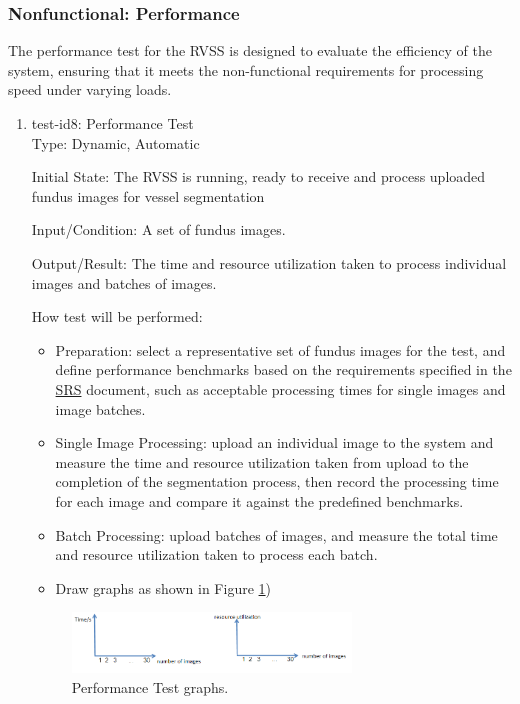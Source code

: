 \documentclass[12pt, titlepage]{article}
\begin{document}
\subsubsection{Nonfunctional: Performance}
\label{non_functional_performance}	
The performance test for the RVSS is designed to evaluate the efficiency of the system, ensuring that it meets the non-functional requirements for processing speed under varying loads.

\begin{enumerate}					
\item{test-id8: Performance Test\\}
\label{test-id-8}
Type: Dynamic, Automatic
					
Initial State: The RVSS is running, ready to receive and process uploaded fundus images for vessel segmentation 
					
Input/Condition: A set of fundus images.
					
Output/Result: The time and resource utilization taken to process individual images and batches of images. 
					
How test will be performed: 
\begin{itemize}
    \item Preparation: select a representative set of fundus images for the test, and define performance benchmarks based on the requirements specified in the \href{https://github.com/lele0007/Blood-vessel-segmentation/blob/main/docs/SRS/SRS.pdf}{SRS} document, such as acceptable processing times for single images and image batches.
    \item Single Image Processing: upload an individual image to the system and measure the time and resource utilization taken from upload to the completion of the segmentation process, then record the processing time for each image and compare it against the predefined benchmarks.
    \item Batch Processing: upload batches of images, and measure the total time and resource utilization taken to process each batch.
    \item Draw graphs as shown in Figure \ref{graph})
\end{itemize}

\begin{figure}[h!]
\begin{center}
\includegraphics[width=0.70\textwidth]{graph}
\caption{
Performance Test graphs.}
\label{graph} 
\end{center}
\end{figure}

\end{enumerate}
\end{document}
